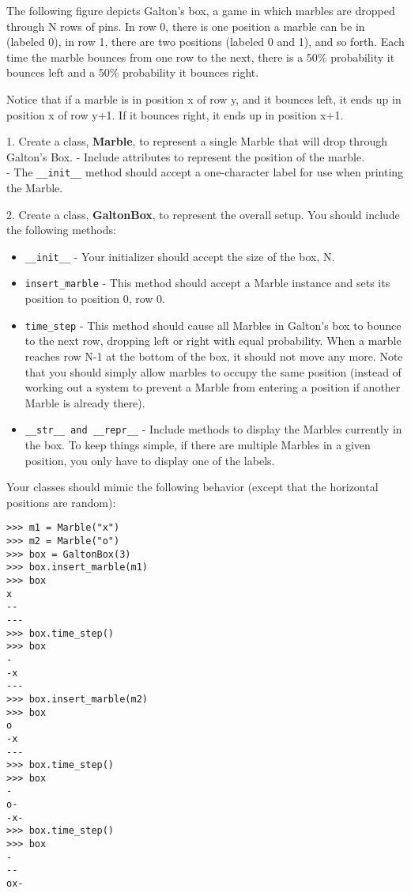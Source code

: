 \documentclass[11pt]{article}
\providecommand{\tightlist}{%
      \setlength{\itemsep}{0pt}\setlength{\parskip}{0pt}}
\begin{document}
The following figure depicts Galton's box, a game in which marbles are
dropped through N rows of pins. In row 0, there is one position a marble
can be in (labeled 0), in row 1, there are two positions (labeled 0 and
1), and so forth. Each time the marble bounces from one row to the next,
there is a 50\% probability it bounces left and a 50\% probability it
bounces right.

Notice that if a marble is in position x of row y, and it bounces left,
it ends up in position x of row y+1. If it bounces right, it ends up in
position x+1.

1. Create a class, \textbf{Marble}, to represent a single Marble that
will drop through Galton's Box. - Include attributes to represent the
position of the marble.\\
- The \texttt{\_\_init\_\_} method should accept a one-character label
for use when printing the Marble.

2. Create a class, \textbf{GaltonBox}, to represent the overall setup.
You should include the following methods:

\begin{itemize}
\tightlist
\item
  \texttt{\_\_init\_\_} - Your initializer should accept the size of the
  box, N.
\item
  \texttt{insert\_marble} - This method should accept a Marble instance
  and sets its position to position 0, row 0.
\item
  \texttt{time\_step} - This method should cause all Marbles in Galton's
  box to bounce to the next row, dropping left or right with equal
  probability. When a marble reaches row N-1 at the bottom of the box,
  it should not move any more. Note that you should simply allow marbles
  to occupy the same position (instead of working out a system to
  prevent a Marble from entering a position if another Marble is already
  there).
\item
  \texttt{\_\_str\_\_\ and\ \_\_repr\_\_} - Include methods to display
  the Marbles currently in the box. To keep things simple, if there are
  multiple Marbles in a given position, you only have to display one of
  the labels.
\end{itemize}

Your classes should mimic the following behavior (except that the
horizontal positions are random):

\begin{verbatim}
>>> m1 = Marble("x")
>>> m2 = Marble("o")
>>> box = GaltonBox(3)
>>> box.insert_marble(m1)
>>> box
x
--
---
>>> box.time_step()
>>> box
-
-x
---
>>> box.insert_marble(m2)
>>> box
o
-x
---
>>> box.time_step()
>>> box
-
o-
-x-
>>> box.time_step()
>>> box
-
--
ox-
\end{verbatim}
\end{document}
